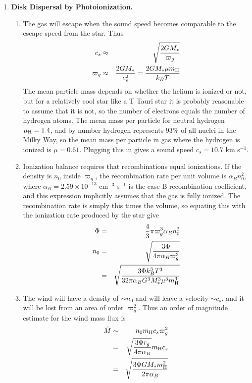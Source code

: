 \begin{enumerate}
\begin{enumerate}
\end{enumerate}


\item {\bf Disk Dispersal by Photoionization.}

\begin{enumerate}

\item The gas will escape when the sound speed becomes comparable to the escape speed from the star. Thus
\begin{eqnarray*}
c_s & \approx & \sqrt{\frac{2 G M_*}{\varpi_g}}\\
\varpi_g & \approx & \frac{2 G M_*}{c_s^2} = \frac{2 G M_* \mu m_{\rm H}}{k_B T}
\end{eqnarray*}
The mean particle mass depends on whether the helium is ionized or not, but for a relatively cool star like a T Tauri star it is probably reasonable to assume that it is not, so the number of electrons equals the number of hydrogen atoms. The mean mass per particle for neutral hydrogen $\mu_{\rm H} = 1.4$, and by number hydrogen represents 93\% of all nuclei in the Milky Way, so the mean mass per particle in gas where the hydrogen is ionized is $\mu=0.61$. Plugging this in gives a sound speed $c_s = 10.7$ km s$^{-1}$.

\item Ionization balance requires that recombinations equal ionizations. If the density is $n_0$ inside $\varpi_g$, the recombination rate per unit volume is $\alpha_B n_0^2$, where $\alpha_B=2.59\times 10^{-13}$ cm$^{-3}$ s$^{-1}$ is the case B recombination coefficient, and this expression implicitly assumes that the gas is fully ionized. The recombination rate is simply this times the volume, so equating this with the ionization rate produced by the star give
\begin{eqnarray*}
\Phi & = & \frac{4}{3}\pi \varpi_g^3 \alpha_B n_0^2 \\
n_0 & = & \sqrt{\frac{3\Phi}{4\pi \alpha_B \varpi_g^3}} \\
& = & \sqrt{\frac{3\Phi k_B^3 T^3}{32\pi \alpha_B G^3 M_*^3 \mu^3 m_{\rm H}^3}}
\end{eqnarray*}

\item The wind will have a density of $\sim n_0$ and will leave a velocity $\sim c_s$, and it will be lost from an area of order $\varpi_g^2$. Thus an order of magnitude estimate for the wind mass flux is
\begin{eqnarray*}
\dot{M} & \sim & n_0 m_{\rm H} c_s \varpi_g^2 \\
& = & \sqrt{\frac{3\Phi r_g}{4\pi \alpha_B}} m_{\rm H} c_s \\
& = & \sqrt{\frac{3\Phi G M_* m_{\rm H}^2}{2\pi \alpha_B}}
\end{eqnarray*}


\end{enumerate}
\end{enumerate}
